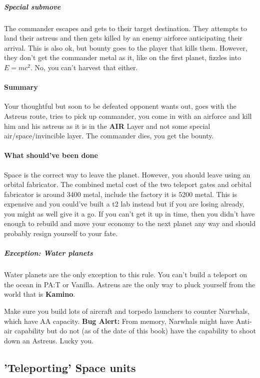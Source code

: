 \documentclass[]{article}
\begin{document}
\subparagraph{Special submove}

The commander escapes and gets to their target destination.  They attempts to land their astreus and then gets killed by an enemy airforce anticipating their arrival.  This is also ok, but bounty goes to the player that kills them.  However, they don't get the commander metal as it, like on the first planet, fizzles into $E=mc^2$.  No, you can't harvest that either.  

\paragraph{Summary}

Your thoughtful but soon to be defeated opponent wants out, goes with the Astreus route, tries to pick up commander, you come in with an airforce and kill him and his astreus as it is in the \textbf{AIR} Layer and not some special air/space/invincible layer.  The commander dies, you get the bounty.  

\paragraph{What should've been done}

Space is the correct way to leave the planet.  However, you should leave using an orbital fabricator.  The combined metal cost of the two teleport gates and orbital fabricator is around 3400 metal, include the factory it is 5200 metal.  This is expensive and you could've built a t2 lab instead but if you are losing already, you might as well give it a go.  If you can't get it up in time, then you didn't have enough to rebuild and move your economy to the next planet any way and should probably resign yourself to your fate.  

\subparagraph{Exception: Water planets}

Water planets are the only exception to this rule.  You can't build a teleport on the ocean in PA:T or Vanilla.  Astreus are the only way to pluck yourself from the world that is \textbf{Kamino}. 

Make sure you build lots of aircraft and torpedo launchers to counter Narwhals, which have AA capacity.  \textbf{Bug Alert:} From memory, Narwhals might have Anti-air capability but do not (as of the date of this book) have the capability to shoot down an Astreus.  Lucky you.  

\subsection{'Teleporting' Space units}
\end{document}
